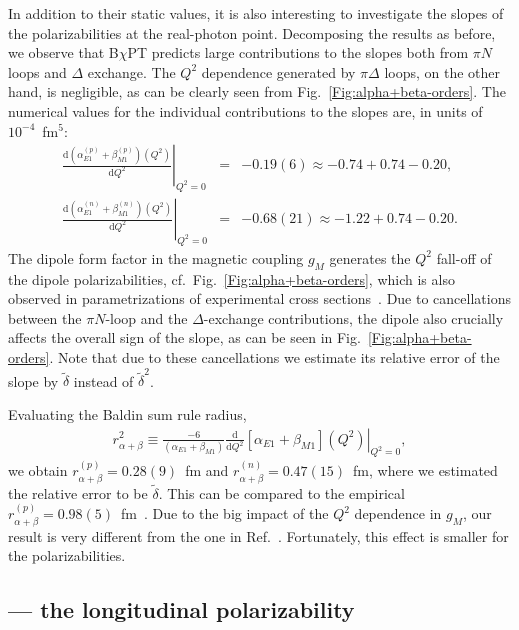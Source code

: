 \documentclass[12pt,preprint,tightenlines,
showpacs,preprintnumbers,amsmath,amssymb,
a4paper,nofootinbib]{revtex4-1}
\def\bea{\begin{eqnarray}}
\def\eea{\end{eqnarray}}
\def\dd{\mathrm{d}}
\begin{document}
In addition to their static values, it is also interesting to investigate the slopes of the polarizabilities at the real-photon point. Decomposing the results as before, we observe that B$\chi$PT predicts large contributions to the slopes both from $\pi N$ loops and $\Delta$ exchange. The $Q^2$ dependence generated by $\pi \Delta$ loops, on the other hand, is negligible,
as can be clearly seen from Fig.~\ref{Fig:alpha+beta-orders}. The numerical values for the individual contributions to the slopes are, in units of $10^{-4}$~fm$^5$:
\bea
\left.\frac{\dd(\alpha_{E1}^{(p)} + \beta_{M1}^{(p)}) (Q^2)}{\dd Q^2}\right|_{Q^2=0}&=&-0.19(6)\approx -0.74  + 0.74-0.20 ,\\
\left.\frac{\dd(\alpha_{E1}^{(n)} + \beta_{M1}^{(n)}) (Q^2)}{\dd Q^2}\right|_{Q^2=0}&=& -0.68(21)\approx-1.22  +0.74-0.20.
\eea
 The dipole form factor in the magnetic coupling $g_M$ generates the $Q^2$ fall-off of the dipole polarizabilities, cf.\ Fig.~\ref{Fig:alpha+beta-orders}, which is also observed
in parametrizations of experimental cross sections~\cite{Hall:2014lea}. 
Due to cancellations between the $\pi N$-loop and the $\Delta$-exchange contributions,
 the dipole also crucially affects the overall sign of the slope, as can be seen in Fig.~\ref{Fig:alpha+beta-orders}. Note that due to these cancellations we estimate its relative error
 of the slope by $\tilde{\delta}$ instead of $\tilde{\delta}^2$.


Evaluating the Baldin sum rule radius, 
\begin{align}\label{Eq:r2alphabetaDef}
r_{\alpha+\beta}^2\equiv \frac{-6}{(\alpha_{E1}+\beta_{M1})}\left.\frac{\dd}{\dd Q^2}[\alpha_{E1}+\beta_{M1}](Q^2)\right|_{Q^2=0},
\end{align}
we obtain $r^{(p)}_{\alpha+\beta}= 0.28(9)$~fm and $r^{(n)}_{\alpha+\beta}=0.47(15)$~fm, 
where we estimated the relative error to be $\tilde{\delta}$. This can be compared to the empirical $r^{(p)}_{\alpha+\beta}=0.98(5)$~fm~\cite{Hall:2014lea}. Due to the big impact of the $Q^2$ dependence in $g_M$, our result is very different from the one in Ref.~\cite{Hall:2014lea}.
Fortunately, this effect is smaller for the polarizabilities.




\subsection{ --- the longitudinal polarizability}
\end{document}
